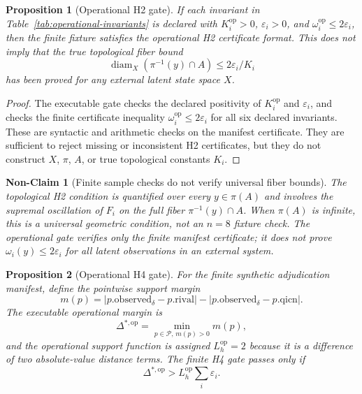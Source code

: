 \documentclass[11pt]{article}
\newtheorem{proposition}{Proposition}
\newtheorem{nonclaim}{Non-Claim}
\begin{document}
\begin{proposition}[Operational H2 gate]\label{prop:op-H2}
If each invariant in Table~\ref{tab:operational-invariants} is declared with $K_i^{\mathrm{op}}>0$, $\varepsilon_i>0$, and $\omega_i^{\mathrm{op}}\leq 2\varepsilon_i$, then the finite fixture satisfies the operational H2 certificate format. This does not imply that the true topological fiber bound
\[
\operatorname{diam}_X(\pi^{-1}(y)\cap A)\leq 2\varepsilon_i/K_i
\]
has been proved for any external latent state space $X$.
\end{proposition}

\begin{proof}
The executable gate checks the declared positivity of $K_i^{\mathrm{op}}$ and $\varepsilon_i$, and checks the finite certificate inequality $\omega_i^{\mathrm{op}}\leq 2\varepsilon_i$ for all six declared invariants. These are syntactic and arithmetic checks on the manifest certificate. They are sufficient to reject missing or inconsistent H2 certificates, but they do not construct $X$, $\pi$, $A$, or true topological constants $K_i$.
\end{proof}

\begin{nonclaim}[Finite sample checks do not verify universal fiber bounds]\label{nonclaim:finite-sample-fibers}
The topological H2 condition is quantified over every $y\in\pi(A)$ and involves the supremal oscillation of $F_i$ on the full fiber $\pi^{-1}(y)\cap A$. When $\pi(A)$ is infinite, this is a universal geometric condition, not an $n=8$ fixture check. The operational gate verifies only the finite manifest certificate; it does not prove $\omega_i(y)\leq 2\varepsilon_i$ for all latent observations in an external system.
\end{nonclaim}

\begin{proposition}[Operational H4 gate]\label{prop:op-H4}
For the finite synthetic adjudication manifest, define the pointwise support margin
\[
m(p)=|p.\mathrm{observed}_{\delta}-p.\mathrm{rival}|-|p.\mathrm{observed}_{\delta}-p.\mathrm{qicn}|.
\]
The executable operational margin is
\[
\Delta^{*,\mathrm{op}}=\min_{p\in\mathcal{P},\,m(p)>0}m(p),
\]
and the operational support function is assigned $L_h^{\mathrm{op}}=2$ because it is a difference of two absolute-value distance terms. The finite H4 gate passes only if
\[
\Delta^{*,\mathrm{op}}>L_h^{\mathrm{op}}\sum_i\varepsilon_i.
\]
\end{proposition}
\end{document}
